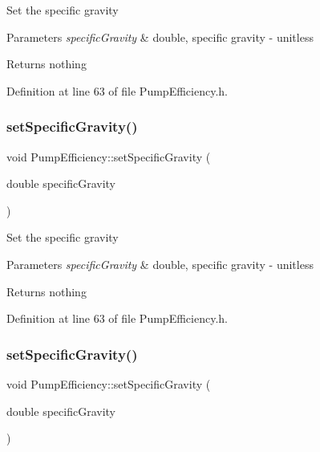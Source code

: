 Set the specific gravity


\begin{DoxyParams}{Parameters}
{\em specific\+Gravity} & double, specific gravity -\/ unitless\\
\hline
\end{DoxyParams}
\begin{DoxyReturn}{Returns}
nothing 
\end{DoxyReturn}


Definition at line 63 of file Pump\+Efficiency.\+h.

\mbox{\label{class_pump_efficiency_afc8b3ecd0fe1a356c82042aa0fc84024}} 
\subsubsection{\texorpdfstring{set\+Specific\+Gravity()}{setSpecificGravity()}\hspace{0.1cm}{\footnotesize\ttfamily [2/3]}}
{\footnotesize\ttfamily void Pump\+Efficiency\+::set\+Specific\+Gravity (\begin{DoxyParamCaption}\item[{double}]{specific\+Gravity }\end{DoxyParamCaption})\hspace{0.3cm}{\ttfamily [inline]}}

Set the specific gravity


\begin{DoxyParams}{Parameters}
{\em specific\+Gravity} & double, specific gravity -\/ unitless\\
\hline
\end{DoxyParams}
\begin{DoxyReturn}{Returns}
nothing 
\end{DoxyReturn}


Definition at line 63 of file Pump\+Efficiency.\+h.

\mbox{\label{class_pump_efficiency_afc8b3ecd0fe1a356c82042aa0fc84024}} 
\subsubsection{\texorpdfstring{set\+Specific\+Gravity()}{setSpecificGravity()}\hspace{0.1cm}{\footnotesize\ttfamily [3/3]}}
{\footnotesize\ttfamily void Pump\+Efficiency\+::set\+Specific\+Gravity (\begin{DoxyParamCaption}\item[{double}]{specific\+Gravity }\end{DoxyParamCaption})\hspace{0.3cm}{\ttfamily [inline]}}


